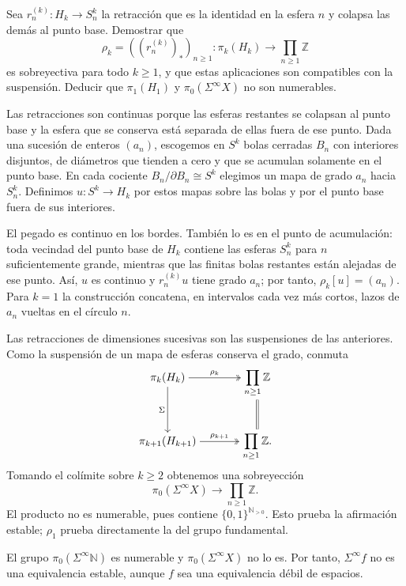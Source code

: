 \begin{ejer}\label{ejer:c14-hawaiano}
Sea $r_n^{(k)}\colon H_k\to S^k_n$ la retracción que es la identidad en la esfera $n$ y colapsa las demás al punto base. Demostrar que
\[
\rho_k=((r_n^{(k)})_*)_{n\ge1}\colon
\pi_k(H_k)\longrightarrow\prod_{n\ge1}\mathbb Z
\]
es sobreyectiva para todo $k\ge1$, y que estas aplicaciones son compatibles con la suspensión. Deducir que $\pi_1(H_1)$ y $\pi_0(\Sigma^\infty X)$ no son numerables.
\end{ejer}
\begin{sol}
Las retracciones son continuas porque las esferas restantes se colapsan al punto base y la esfera que se conserva está separada de ellas fuera de ese punto. Dada una sucesión de enteros $(a_n)$, escogemos en $S^k$ bolas cerradas $B_n$ con interiores disjuntos, de diámetros que tienden a cero y que se acumulan solamente en el punto base. En cada cociente $B_n/\partial B_n\cong S^k$ elegimos un mapa de grado $a_n$ hacia $S^k_n$. Definimos $u\colon S^k\to H_k$ por estos mapas sobre las bolas y por el punto base fuera de sus interiores.

El pegado es continuo en los bordes. También lo es en el punto de acumulación: toda vecindad del punto base de $H_k$ contiene las esferas $S^k_n$ para $n$ suficientemente grande, mientras que las finitas bolas restantes están alejadas de ese punto. Así, $u$ es continuo y $r_n^{(k)}u$ tiene grado $a_n$; por tanto, $\rho_k[u]=(a_n)$. Para $k=1$ la construcción concatena, en intervalos cada vez más cortos, lazos de $a_n$ vueltas en el círculo $n$.

Las retracciones de dimensiones sucesivas son las suspensiones de las anteriores. Como la suspensión de un mapa de esferas conserva el grado, conmuta
\[
\begin{tikzcd}[cramped,column sep=large,row sep=large]
\pi_k(H_k) \arrow[r,"\rho_k",two heads] \arrow[d,"\Sigma"']
& \displaystyle\prod_{n\ge1}\mathbb Z \arrow[d,equal]\\
\pi_{k+1}(H_{k+1}) \arrow[r,"\rho_{k+1}",two heads]
& \displaystyle\prod_{n\ge1}\mathbb Z.
\end{tikzcd}
\]
Tomando el colímite sobre $k\ge2$ obtenemos una sobreyección
\[
\pi_0(\Sigma^\infty X)\longrightarrow\prod_{n\ge1}\mathbb Z.
\]
El producto no es numerable, pues contiene $\{0,1\}^{\mathbb N_{>0}}$. Esto prueba la afirmación estable; $\rho_1$ prueba directamente la del grupo fundamental.
\end{sol}

El grupo $\pi_0(\Sigma^\infty\mathbb N)$ es numerable y $\pi_0(\Sigma^\infty X)$ no lo es. Por tanto, $\Sigma^\infty f$ no es una equivalencia estable, aunque $f$ sea una equivalencia débil de espacios.

